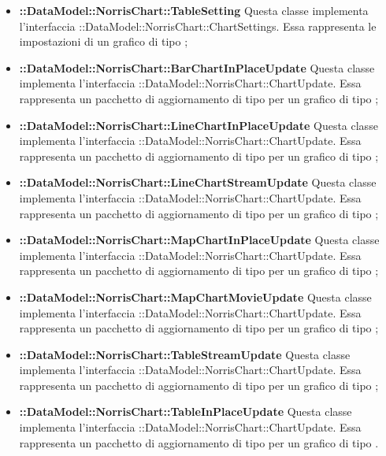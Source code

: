 \begin{itemize}
		\item \textbf{::DataModel::NorrisChart::TableSetting} Questa classe implementa l'interfaccia ::DataModel::NorrisChart::ChartSettings. Essa rappresenta le impostazioni di un grafico di tipo ;

		\item \textbf{::DataModel::NorrisChart::BarChartInPlaceUpdate} Questa classe implementa l'interfaccia ::DataModel::NorrisChart::ChartUpdate. Essa rappresenta un pacchetto di aggiornamento di tipo  per un grafico di tipo ;

		\item \textbf{::DataModel::NorrisChart::LineChartInPlaceUpdate} Questa classe implementa l'interfaccia ::DataModel::NorrisChart::ChartUpdate. Essa rappresenta un pacchetto di aggiornamento di tipo  per un grafico di tipo ;

		\item \textbf{::DataModel::NorrisChart::LineChartStreamUpdate} Questa classe implementa l'interfaccia ::DataModel::NorrisChart::ChartUpdate. Essa rappresenta un pacchetto di aggiornamento di tipo  per un grafico di tipo ;

		\item \textbf{::DataModel::NorrisChart::MapChartInPlaceUpdate} Questa classe implementa l'interfaccia ::DataModel::NorrisChart::ChartUpdate. Essa rappresenta un pacchetto di aggiornamento di tipo  per un grafico di tipo ;

		\item \textbf{::DataModel::NorrisChart::MapChartMovieUpdate} Questa classe implementa l'interfaccia ::DataModel::NorrisChart::ChartUpdate. Essa rappresenta un pacchetto di aggiornamento di tipo  per un grafico di tipo ;

		\item \textbf{::DataModel::NorrisChart::TableStreamUpdate} Questa classe implementa l'interfaccia ::DataModel::NorrisChart::ChartUpdate. Essa rappresenta un pacchetto di aggiornamento di tipo  per un grafico di tipo ;

		\item \textbf{::DataModel::NorrisChart::TableInPlaceUpdate} Questa classe implementa l'interfaccia ::DataModel::NorrisChart::ChartUpdate. Essa rappresenta un pacchetto di aggiornamento di tipo  per un grafico di tipo .
	\end{itemize}
